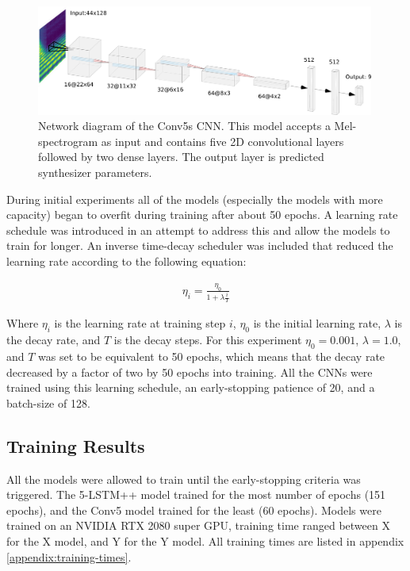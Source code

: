 \begin{figure}[ht]
    \centering
    \includegraphics[width=0.99\textwidth]{figures/inverse-synth/CONV5s_Diagram.png}
    \caption{Network diagram of the Conv5s CNN. This model accepts a Mel-spectrogram as input and contains five 2D convolutional layers followed by two dense layers. The output layer is predicted synthesizer parameters.}
    \label{fig:conv5s}
\end{figure}

During initial experiments all of the models (especially the models with more capacity) began to overfit during training after about 50 epochs. A learning rate schedule was introduced in an attempt to address this and allow the models to train for longer. An inverse time-decay scheduler was included that reduced the learning rate according to the following equation:

\begin{align}
    \eta_i = \frac{\eta_0}{1 + \lambda\frac{i}{T}}
\end{align}

Where $\eta_i$ is the learning rate at training step $i$, $\eta_0$ is the initial learning rate, $\lambda$ is the decay rate, and $T$ is the decay steps. For this experiment $\eta_0=0.001$, $\lambda=1.0$, and $T$ was set to be equivalent to 50 epochs, which means that the decay rate decreased by a factor of two by 50 epochs into training. All the CNNs were trained using this learning schedule, an early-stopping patience of 20, and a batch-size of 128. 

\subsection{Training Results}
All the models were allowed to train until the early-stopping criteria was triggered. The 5-LSTM++ model trained for the most number of epochs (151 epochs), and the Conv5 model trained for the least (60 epochs). Models were trained on an NVIDIA RTX 2080 super GPU, training time ranged between X for the X model, and Y for the Y model. All training times are listed in appendix \ref{appendix:training-times}.

